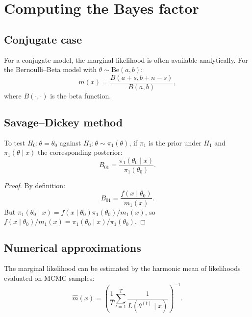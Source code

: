 \section{Computing the Bayes factor}

\subsection{Conjugate case}

\begin{proposition}
For a conjugate model, the marginal likelihood is often available
analytically. For the Bernoulli--Beta model with
$\theta \sim \text{Be}(a, b)$:
\[
  m(x) = \frac{B(a + s, b + n - s)}{B(a, b)},
\]
where $B(\cdot, \cdot)$ is the beta function.
\end{proposition}

\subsection{Savage--Dickey method}

\begin{theorem}
To test $H_0 : \theta = \theta_0$ against
$H_1 : \theta \sim \pi_1(\theta)$, if $\pi_1$ is the prior under $H_1$
and $\pi_1(\theta \mid x)$ the corresponding posterior:
\[
  B_{01} = \frac{\pi_1(\theta_0 \mid x)}{\pi_1(\theta_0)}.
\]
\end{theorem}

\begin{proof}
By definition:
\[
  B_{01} = \frac{f(x \mid \theta_0)}{m_1(x)}.
\]
But $\pi_1(\theta_0 \mid x) = f(x \mid \theta_0)\pi_1(\theta_0)/m_1(x)$,
so $f(x \mid \theta_0)/m_1(x) = \pi_1(\theta_0 \mid x)/\pi_1(\theta_0)$.
\end{proof}

\subsection{Numerical approximations}

\begin{definition}
The marginal likelihood can be estimated by the harmonic mean of
likelihoods evaluated on MCMC samples:
\[
  \hat{m}(x) = \left(\frac{1}{T}\sum_{t=1}^T \frac{1}{L(\theta^{(t)} \mid x)}\right)^{-1}.
\]
\end{definition}


